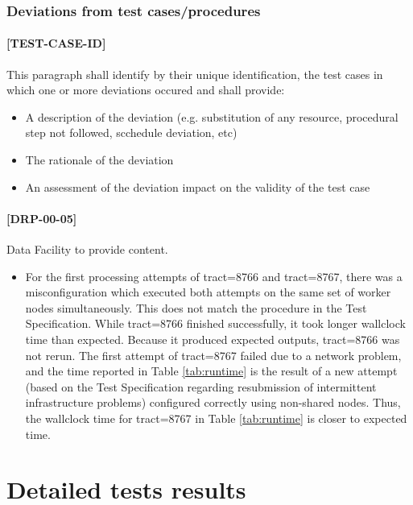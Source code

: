 \documentclass[DM,lsstdraft,STR,toc]{lsstdoc}
\begin{document}
\subsubsection{Deviations from test cases/procedures}
\paragraph{[TEST-CASE-ID]}
This paragraph shall identify by their unique identification, the test cases in which one or more deviations occured and shall provide:
\begin{itemize}
\item A description of the deviation (e.g. substitution of any resource, procedural step not followed, scchedule deviation, etc)
\item The rationale of the deviation
\item An assessment of the deviation impact on the validity of the test case
\end{itemize}

\paragraph{[DRP-00-05]} \label{sec:deviation-drp-00-05}
\begin{note}
Data Facility to provide content.
\end{note}
\begin{itemize}
  \item For the first processing attempts of tract=8766 and tract=8767,
	there was a misconfiguration which executed both attempts
	on the same set of worker nodes simultaneously. This does
	not match the procedure in the Test Specification.  While
	tract=8766 finished successfully, it took longer wallclock
	time than expected. Because it produced expected outputs,
	tract=8766 was not rerun.  The first attempt of tract=8767
	failed due to a network problem, and the time reported in
        Table \ref{tab:runtime} is the result of a new attempt
	(based on the Test Specification regarding resubmission of
	intermittent infrastructure problems) configured correctly
	using non-shared nodes.  Thus, the wallclock time for
	tract=8767 in Table \ref{tab:runtime} is closer to expected
	time.
\end{itemize}

\appendix

\newpage
\section{Detailed tests results \label{sect:results}}






\end{document}
